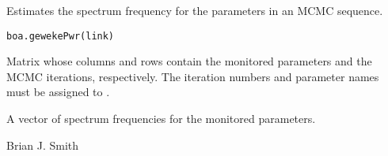 \begin{Description}\relax
Estimates the spectrum frequency for the parameters in an MCMC sequence.
\end{Description}
\begin{Usage}
\begin{verbatim}
boa.gewekePwr(link)
\end{verbatim}
\end{Usage}
\begin{Arguments}
\begin{ldescription}
\item[\code{link}] Matrix whose columns and rows contain the monitored parameters
and the MCMC iterations, respectively. The iteration numbers and parameter
names must be assigned to .
\end{ldescription}
\end{Arguments}
\begin{Value}
A vector of spectrum frequencies for the monitored parameters.
\end{Value}
\begin{Author}\relax
Brian J. Smith
\end{Author}

